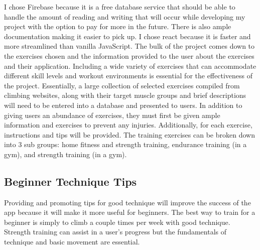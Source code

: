 \documentclass[10pt,twocolumn]{article}
\begin{document}
    
    I chose Firebase because it is a free database service that should be able to handle the amount of reading and writing that will occur while developing my project with the option to pay for more in the future. There is also ample documentation making it easier to pick up. I chose react because it is faster and more streamlined than vanilla JavaScript. 
    The bulk of the project comes down to the exercises chosen and the information provided to the user about the exercises and their application. Including a wide variety of exercises that can accommodate different skill levels and workout environments is essential for the effectiveness of the project. Essentially, a large collection of selected exercises compiled from climbing websites, along with their target muscle groups and brief descriptions will need to be entered into a database and presented to users. In addition to giving users an abundance of exercises, they must first be given ample information and exercises to prevent any injuries. Additionally, for each exercise, instructions and tips will be provided. The training exercises can be broken down into 3 sub groups: home fitness and strength training, endurance training (in a gym), and strength training (in a gym). 

\subsection{Beginner Technique Tips}

    Providing and promoting tips for good technique will improve the success of the app because it will make it more useful for beginners. The best way to train for a beginner is simply to climb a couple times per week with good technique. Strength training can assist in a user's progress but the fundamentals of technique and basic movement are essential. 
\end{document}
